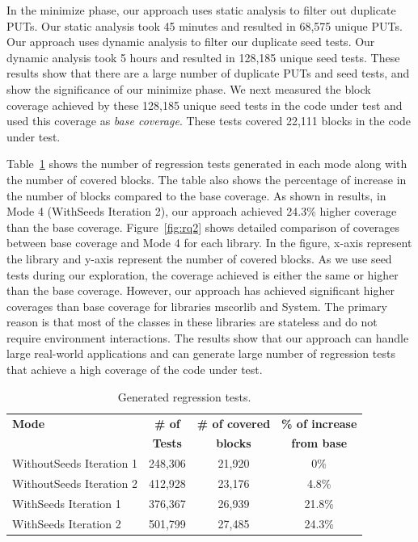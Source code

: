 In the minimize phase, our approach uses static analysis to filter out 
duplicate PUTs. Our static analysis took 45 minutes and resulted in 68,575 unique PUTs. 
Our approach uses dynamic analysis to filter our duplicate seed tests.
Our dynamic analysis took 5 hours and resulted in 128,185 unique seed tests.
These results show that there are a large number of duplicate PUTs
and seed tests, and show the significance of our minimize phase. 
We next measured the block coverage achieved by these 128,185 unique seed tests
in the code under test and used this coverage as \emph{base coverage}.
These tests covered 22,111 blocks in the code under test.

Table~\ref{tab:gentests} shows the number of regression tests generated in each mode
along with the number of covered blocks. The table also shows the percentage of increase
in the number of blocks compared to the base coverage. As shown in results,
in Mode 4 (WithSeeds Iteration 2), our approach achieved 24.3\% higher
coverage than the base coverage. Figure~\ref{fig:rq2} shows detailed
comparison of coverages between base coverage and Mode 4 for each library.
In the figure, x-axis represent the library and y-axis represent the number
of covered blocks. As we use seed tests during our exploration, the 
coverage achieved is either the same or higher than the base coverage.
However, our approach has achieved significant higher coverages than
base coverage for libraries mscorlib and System. The primary reason is that most of the classes in these
libraries are stateless and do not require environment interactions.
The results show that our approach can handle large real-world applications 
and can generate large number of regression tests that achieve a high coverage of the code under test.

\setlength{\tabcolsep}{1pt}
\begin{table}[t]
\begin{SmallOut}
\begin{CodeOut}
\begin{center}
\begin {tabular} {|l|c|c|c|}
\hline
\textbf{Mode} & \textbf{\# of} & \textbf{\# of covered} & \textbf{\% of increase}\\  
 & \textbf{Tests} & \textbf{blocks} & \textbf{from base}\\  
\hline
\hline  WithoutSeeds Iteration 1 & 248,306 & 21,920 & 0\%\\
\hline  WithoutSeeds Iteration 2 & 412,928 & 23,176 & 4.8\%\\
\hline  WithSeeds Iteration 1 & 376,367 & 26,939 & 21.8\%\\
\hline  WithSeeds Iteration 2 & 501,799 & 27,485 & 24.3\%\\
\hline
\end{tabular}
\end{center}
\end{CodeOut}
\end{SmallOut}\vspace*{-4ex}
\centering \caption {\label{tab:gentests}Generated regression tests.}
\end{table}

